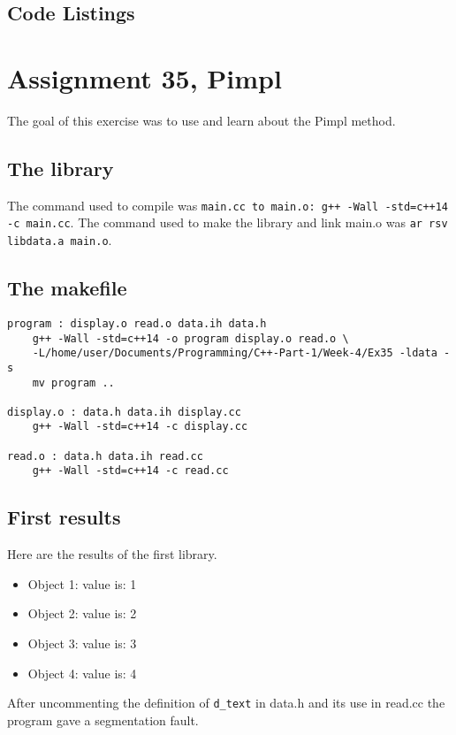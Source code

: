 \documentclass[11pt]{article}
\begin{document}
\subsection*{Code Listings}



\section*{Assignment 35, Pimpl}
The goal of this exercise was to use and learn about the Pimpl method.

\subsection*{The library}
The command used to compile was \texttt{main.cc to main.o: g++ -Wall -std=c++14 -c main.cc}.
The command used to make the library and link main.o was \texttt{ar rsv libdata.a main.o}.

\subsection*{The makefile}
\begin{lstlisting}
program : display.o read.o data.ih data.h
	g++ -Wall -std=c++14 -o program display.o read.o \
    -L/home/user/Documents/Programming/C++-Part-1/Week-4/Ex35 -ldata -s
	mv program ..

display.o : data.h data.ih display.cc
	g++ -Wall -std=c++14 -c display.cc

read.o : data.h data.ih read.cc
	g++ -Wall -std=c++14 -c read.cc
\end{lstlisting}

\subsection*{First results}
Here are the results of the first library.
\begin{itemize}
\item Object 1: value is: 1
\item Object 2: value is: 2
\item Object 3: value is: 3
\item Object 4: value is: 4
\end{itemize}

After uncommenting the definition of \texttt{d\_text} in data.h and its use in read.cc the program gave a segmentation fault.
\end{document}
